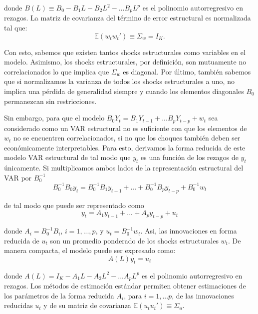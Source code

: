 \documentclass[
]{book}
\begin{document}
donde \(B(L) \equiv B_0 - B_1 L - B_2 L^2 - ...B_p L^p\) es el polinomio autorregresivo en rezagos. La matriz de covarianza del término de error estructural es normalizada tal que:
\begin{equation}
\mathbb{E}(w_t w_t') \equiv \Sigma_w = I_K.
\end{equation}

Con esto, sabemos que existen tantos shocks estructurales como variables en el modelo. Asimismo, los shocks estructurales, por definición, son mutuamente no correlacionados lo que implica que \(\Sigma_w\) es diagonal. Por último, también sabemos que si normalizamos la varianza de todos los shocks estructurales a uno, no implica una pérdida de generalidad siempre y cuando los elementos diagonales \(B_0\) permanezcan sin restricciones.

Sin embargo, para que el modelo \(B_0 Y_t = B_1 Y_{t-1} + ... B_p Y_{t-p} + w_t\) sea considerado como un VAR estructural no es suficiente con que los elementos de \(w_t\) no se encuentren correlacionados, si no que los choques también deben ser económicamente interpretables. Para esto, derivamos la forma reducida de este modelo VAR estructural de tal modo que \(y_t\) es una función de los rezagos de \(y_t\) únicamente. Si multiplicamos ambos lados de la representación estructural del VAR por \(B_0^{-1}\)
\begin{equation}
B_0^{-1} B_0 y_t = B_0^{-1} B_1 y_{t-1} + ... + B_0^{-1} B_p y_{t-p} + B_0^{-1} w_t
\end{equation}

de tal modo que puede ser representado como
\begin{equation}
y_t = A_1 y_{t-1} + ... + A_p y_{t-p} + u_t 
\end{equation}

donde \(A_i = B_0^{-1} B_i\), \(i = 1,...,p\), y \(u_t = B_0^{-1} w_t\). Asi, las innovaciones en forma reducida de \(u_t\) son un promedio ponderado de los shocks estructurales \(w_t\). De manera compacta, el modelo puede ser expresado como:
\begin{equation}
A(L) y_t = u_t 
\end{equation}

donde \(A(L) = I_K - A_1L - A_2 L^2 - ... A_p L^p\) es el polinomio autorregresivo en rezagos. Los métodos de estimación estándar permiten obtener estimaciones de los parámetros de la forma reducida \(A_i\), para \(i=1,...p\), de las innovaciones reducidas \(u_t\) y de su matriz de covarianza \(\mathbb{E}(u_t u_t') \equiv \Sigma_u\).
\end{document}
